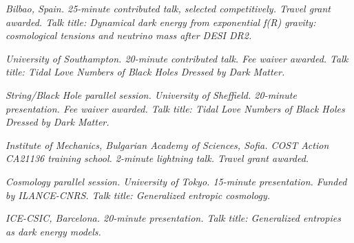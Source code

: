 \resumeSubHeadingListStart
{}
\begin{indentedtext}
\textit{Bilbao, Spain. 25-minute contributed talk, selected competitively. Travel grant awarded. Talk title: Dynamical dark energy from exponential f(R) gravity: cosmological tensions and neutrino mass after DESI DR2.}
\end{indentedtext}
\resumeSubHeadingListEnd

\resumeSubHeadingListStart
{}
\begin{indentedtext}
\textit{University of Southampton. 20-minute contributed talk. Fee waiver awarded. Talk title: Tidal Love Numbers of Black Holes Dressed by Dark Matter.}
\end{indentedtext}
\resumeSubHeadingListEnd

\resumeSubHeadingListStart
{}
\begin{indentedtext}
\textit{String/Black Hole parallel session. University of Sheffield. 20-minute presentation. Fee waiver awarded. Talk title: Tidal Love Numbers of Black Holes Dressed by Dark Matter.}
\end{indentedtext}
\resumeSubHeadingListEnd

\resumeSubHeadingListStart
{}
\begin{indentedtext}
\textit{Institute of Mechanics, Bulgarian Academy of Sciences, Sofia. COST Action CA21136 training school. 2-minute lightning talk. Travel grant awarded.}
\end{indentedtext}
\resumeSubHeadingListEnd

\resumeSubHeadingListStart
{}
\begin{indentedtext}
\textit{Cosmology parallel session. University of Tokyo. 15-minute presentation. Funded by ILANCE-CNRS. Talk title: Generalized entropic cosmology.}
\end{indentedtext}
\resumeSubHeadingListEnd

\resumeSubHeadingListStart
{}
\begin{indentedtext}
\textit{ICE-CSIC, Barcelona. 20-minute presentation. Talk title: Generalized entropies as dark energy models.}
\end{indentedtext}
\resumeSubHeadingListEnd

